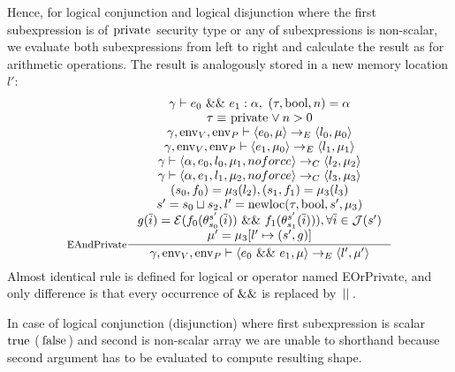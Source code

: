 \documentclass[a4paper, 10pt, draft]{report}
\DeclareMathOperator*{\env}{env}
\DeclareMathOperator*{\newloc}{newloc}
\newcommand{\mycode}[1]{\ensuremath{\mbox{\lstinline{#1}}}}
\begin{document}
Hence, for logical conjunction and logical disjunction where the first
subexpression is of \mycode{private} security type or any of subexpressions is
non-scalar, we evaluate both subexpressions from left to right and calculate
the result as for arithmetic operations. The result is analogously stored in a
new memory location $l'$:
\[\begin{array}{c}
\inference[EAndPrivate]{
  \gamma |- e_0\ \mycode{&&}\ e_1 : \alpha,\ \left( \tau, \mycode{bool} , n \right) = \alpha \\
  \tau \equiv \mycode{private} \lor n > 0 \\
  \gamma, \env_V, \env_P |- \left<e_0, \mu \right> \to_E \left<l_0, \mu_0 \right> \\
  \gamma, \env_V, \env_P |- \left<e_1, \mu_0 \right> \to_E \left<l_1, \mu_1 \right> \\
  \gamma |- \left<\alpha, e_0, l_0, \mu_1, noforce \right> \to_C \left<l_2, \mu_2 \right> \\
  \gamma |- \left<\alpha, e_1, l_1, \mu_2, noforce \right> \to_C \left<l_3, \mu_3 \right> \\
  (s_0,f_0) = \mu_3(l_2), (s_1,f_1) = \mu_3(l_3) \\
  s' = s_0 \sqcup s_2, l' = \newloc(\tau, \mycode{bool}, s', \mu_3) \\
  g(\overline{i}) = \mathcal{E}(f_0(\theta_{s_0}^{s'}(\overline{i}))\ \mycode{&&}\ f_1(\theta_{s_1}^{s'}(\overline{i}))), \forall \overline{i} \in \mathcal{J}(s') \\
  \mu' = \mu_3[l' \mapsto (s',g)]
}{
  \gamma, \env_V, \env_P |- \left<e_0\ \mycode{&&}\ e_1, \mu \right> \to_E \left<l', \mu' \right>
}

\end{array}\]
Almost identical rule is defined for logical or operator named EOrPrivate, and
only difference is that every occurrence of $\mycode{&&}$ is replaced by
$\mycode{||}$.

In case of logical conjunction (disjunction) where first subexpression is
scalar \mycode{true} (\mycode{false}) and second is non-scalar array we are
unable to shorthand because second argument has to be evaluated to compute
resulting shape.
\end{document}
